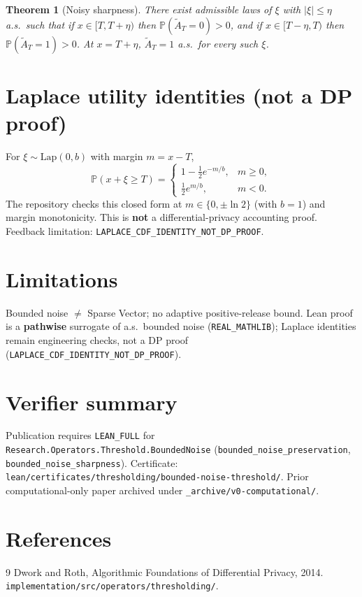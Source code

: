 \documentclass[11pt]{article}
\newtheorem{theorem}{Theorem}
\begin{document}
\begin{theorem}[Noisy sharpness]\label{thm:noisy-sharp}
There exist admissible laws of \(\xi\) with \(\lvert\xi\rvert\le\eta\) a.s.\ such that
if \(x\in[T,T+\eta)\) then \(\mathbb{P}(\widetilde A_T=0)>0\), and if
\(x\in[T-\eta,T)\) then \(\mathbb{P}(\widetilde A_T=1)>0\).
At \(x=T+\eta\), \(\widetilde A_T=1\) a.s.\ for every such \(\xi\).
\end{theorem}

\section{Laplace utility identities (not a DP proof)}
For \(\xi\sim\mathrm{Lap}(0,b)\) with margin \(m=x-T\),
\[
\mathbb{P}(x+\xi\ge T)=
\begin{cases}
1-\tfrac12 e^{-m/b}, & m\ge 0,\\
\tfrac12 e^{m/b}, & m<0.
\end{cases}
\]
The repository checks this closed form at \(m\in\{0,\pm\ln 2\}\) (with \(b=1\))
and margin monotonicity.
This is \textbf{not} a differential-privacy accounting proof.
Feedback limitation: \texttt{LAPLACE\_CDF\_IDENTITY\_NOT\_DP\_PROOF}.

\section{Limitations}
Bounded noise \(\neq\) Sparse Vector; no adaptive positive-release bound.
Lean proof is a \textbf{pathwise} surrogate of a.s.\ bounded noise
(\texttt{REAL\_MATHLIB}); Laplace identities remain engineering checks,
not a DP proof (\texttt{LAPLACE\_CDF\_IDENTITY\_NOT\_DP\_PROOF}).

\section{Verifier summary}
Publication requires \texttt{LEAN\_FULL} for
\texttt{Research.Operators.Threshold.BoundedNoise}
(\texttt{bounded\_noise\_preservation}, \texttt{bounded\_noise\_sharpness}).
Certificate:
\texttt{lean/certificates/thresholding/bounded-noise-threshold/}.
Prior computational-only paper archived under \texttt{\_archive/v0-computational/}.

\section*{References}
\begin{thebibliography}{9}
Dwork and Roth, Algorithmic Foundations of Differential Privacy, 2014.
\texttt{implementation/src/operators/thresholding/}.
\end{thebibliography}
\end{document}
